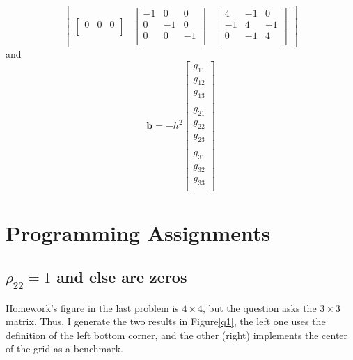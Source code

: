 \documentclass[12pt]{article}
\begin{document}
\[\begin{bmatrix}
\begin{bmatrix}
                0 & 0 & 0\\
            \end{bmatrix}
            &
            \begin{bmatrix}
                -1 & 0  & 0 \\
                0  & -1 & 0 \\
                0  & 0  & -1\\
            \end{bmatrix}
            &
            \begin{bmatrix}
                4  & -1 & 0 \\
                -1 & 4  & -1\\
                0  & -1 & 4 \\
            \end{bmatrix}
        \end{bmatrix}
    \]
    and 
    \[
        \mathbf{b} = -h^{2}
        \begin{bmatrix}
            g_{11}\\
            g_{12}\\
            g_{13}\\
            \\
            g_{21}\\
            g_{22}\\
            g_{23}\\
            \\
            g_{31}\\
            g_{32}\\
            g_{33}\\
        \end{bmatrix}
    \]

    \section{Programming Assignments}
    \subsection{$\rho_{22} = 1$ and else are zeros}
    Homework's figure in the last problem is $4 \times 4$, but the question asks the $3 \times 3$ matrix. Thus, I generate the two results in Figure\ref{q1}, the left one uses the definition of the left bottom corner, and the other (right) implements the center of the grid as a benchmark.
\end{document}
